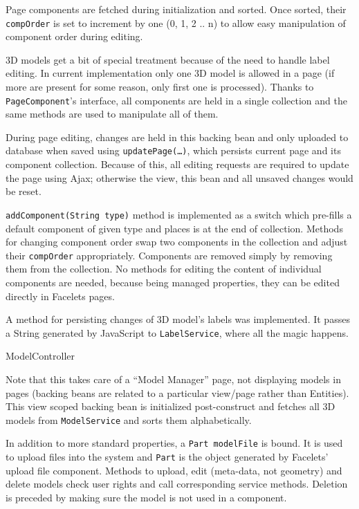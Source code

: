 Page components are fetched during initialization and sorted. Once sorted, their {\tt compOrder} is set to increment by one (0, 1, 2 .. n) to allow easy manipulation of component order during editing.

3D models get a bit of special treatment because of the need to handle label editing. In current implementation only one 3D model is allowed in a page (if more are present for some reason, only first one is processed).  Thanks to {\tt PageComponent}’s interface, all components are held in a single collection and the same methods are used to manipulate all of them.

During page editing, changes are held in this backing bean and only uploaded to database when saved using {\tt updatePage(…)}, which persists current page and its component collection. Because of this, all editing requests are required to update the page using Ajax; otherwise the view, this bean and all unsaved changes would be reset.

{\tt addComponent(String type)} method is implemented as a switch which pre-fills a default component of given type and places is at the end of collection. Methods for changing component order swap two components in the collection and adjust their {\tt compOrder} appropriately. Components are removed simply by removing them from the collection. No methods for editing the content of individual components are needed, because being managed properties, they can be edited directly in Facelets pages.

A method for persisting changes of 3D model’s labels was implemented. It passes a  String generated by JavaScript to {\tt LabelService}, where all the magic happens.

\secc ModelController

Note that this takes care of a “Model Manager” page, not displaying models in pages (backing beans are related to a particular view/page rather than Entities). This view scoped backing bean is initialized post-construct and fetches all 3D models from {\tt ModelService} and sorts them alphabetically.

In addition to more standard properties, a {\tt Part modelFile} is bound. It is used to upload files into the system and {\tt Part} is the object generated by Facelets’ upload file component. Methods to upload, edit (meta-data, not geometry) and delete models check user rights and call corresponding service methods. Deletion is preceded by making sure the model is not used in a component.

